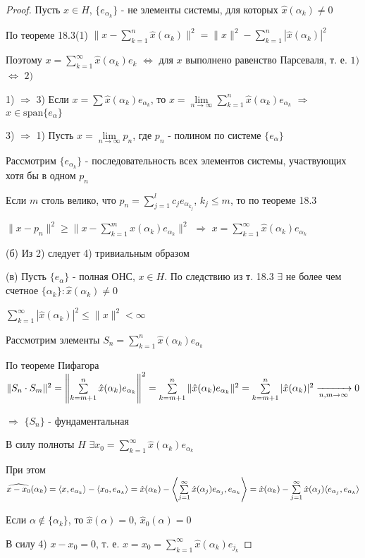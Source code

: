 \documentclass[a4paper,12pt]{report}
\newcommand*{\hm}[1]{#1\nobreak\discretionary{}%
            {\hbox{$\mathsurround=0pt #1$}}{}}
\begin{document}
\begin{proof}
Пусть $x\in H$, $\{e_{\alpha_k}\}$ - не элементы системы, для которых $\hat x(\alpha_k)\ne0$

По теореме 18.3(1) $\|x-\sum\limits_{k=1}^n\hat x(\alpha_k)\|^2=\|x\|^2-\sum\limits_{k=1}^n|\hat x(\alpha_k)|^2$

Поэтому $x=\sum\limits_{k=1}^\infty\hat x(\alpha_k)e_k$ $\Leftrightarrow$ для $x$ выполнено равенство Парсеваля, т. е. $1)$ $\Leftrightarrow$ $2)$

1) $\Rightarrow$ 3) Если $x=\sum\hat x(\alpha_k) e_{\alpha_k}$, то $x=\lim\limits_{n\to\infty}\sum\limits_{k=1}^n\hat x(\alpha_k)e_{\alpha_k}$ $\Rightarrow$ $x\in\mathrm{span}\{e_\alpha\}$

3) $\Rightarrow$ 1) Пусть $x=\lim\limits_{n\to\infty} p_n$, где $p_n$ - полином по системе $\{e_\alpha\}$

Рассмотрим $\{e_{\alpha_k}\}$ - последовательность всех элементов системы, участвующих хотя бы в одном $p_n$

Если $m$ столь велико, что $p_n=\sum\limits_{j=1}^l c_j e_{\alpha_{k_j}}$, $k_j\le m$, то по теореме 18.3

$\|x-p_n\|^2\ge\|x-\sum\limits_{k=1}^m\hat x(\alpha_k)e_{\alpha_k}\|^2$ $\Rightarrow$ $x=\sum\limits_{k=1}^\infty \hat x(\alpha_k)e_{\alpha_k}$

(б) Из 2) следует 4) тривиальным образом

(в) Пусть $\{e_\alpha\}$ - полная ОНС, $x\in H$. По следствию из т. 18.3 $\exists$ не более чем счетное $\{\alpha_k\}\colon\hat x(\alpha_k)\ne0$

$\sum\limits_{k=1}^\infty|\hat x(\alpha_k)|^2\le\|x\|^2<\infty$

Рассмотрим элементы $S_n=\sum\limits_{k=1}^n\hat x(\alpha_k)e_{\alpha_k}$

По теореме Пифагора $\|S_n\cdot S_m\|^2=\left\|\sum\limits_{k=m+1}^n\hat x(\alpha_k)e_{\alpha_k}\right\|^2=\sum\limits_{k=m+1}^n\|\hat x(\alpha_k)e_{\alpha_k}\|^2\hm=\sum\limits_{k=m+1}^n|\hat x(\alpha_k)|^2\xrightarrow[n,m\to\infty]{}0$

$\Rightarrow$ $\{S_n\}$ - фундаментальная

В силу полноты $H$ $\exists x_0=\sum\limits_{k=1}^\infty\hat x(\alpha_k)e_{\alpha_k}$

При этом $\widehat{x-x_0}(\alpha_k)=\langle x,e_{\alpha_k}\rangle-\langle x_0,e_{\alpha_k}\rangle=\hat x(\alpha_k)-\left\langle\sum\limits_{j=1}^\infty \hat x(\alpha_j)e_{\alpha_j},e_{\alpha_k}\right\rangle\hm=\hat x(\alpha_k)-\sum\limits_{j=1}^\infty\hat x(\alpha_j)\langle e_{\alpha_j},e_{\alpha_k}\rangle$

Если $\alpha\notin\{\alpha_k\}$, то $\hat x(\alpha)=0$, $\hat x_0(\alpha)=0$

В силу 4) $x-x_0=0$, т. е. $x=x_0=\sum\limits_{k=1}^\infty\hat x(\alpha_k)e_{j_k}$
\end{proof}
 
\end{document}

